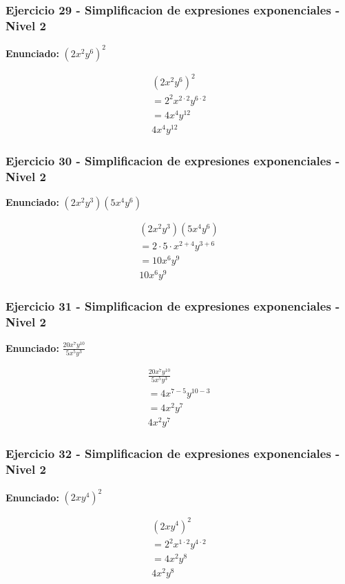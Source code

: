 \documentclass[12pt,a4paper]{article}
\begin{document}
\subsubsection*{Ejercicio 29 - Simplificacion de expresiones exponenciales - Nivel 2}
\textbf{Enunciado:} \(\left(2x^{2}y^{6}\right)^{2}\)

\[
\begin{aligned}
\left(2x^{2}y^{6}\right)^{2}\\
=2^{2}x^{2\cdot 2}y^{6\cdot 2}\\
=4x^{4}y^{12}\\
\boxed{4x^{4}y^{12}}
\end{aligned}
\]


\subsubsection*{Ejercicio 30 - Simplificacion de expresiones exponenciales - Nivel 2}
\textbf{Enunciado:} \((2x^{2}y^{3})(5x^{4}y^{6})\)

\[
\begin{aligned}
(2x^{2}y^{3})(5x^{4}y^{6})\\
=2\cdot 5\cdot x^{2+4}y^{3+6}\\
=10x^{6}y^{9}\\
\boxed{10x^{6}y^{9}}
\end{aligned}
\]


\subsubsection*{Ejercicio 31 - Simplificacion de expresiones exponenciales - Nivel 2}
\textbf{Enunciado:} \(\frac{20x^{7}y^{10}}{5x^{5}y^{3}}\)

\[
\begin{aligned}
\frac{20x^{7}y^{10}}{5x^{5}y^{3}}\\
=4x^{7-5}y^{10-3}\\
=4x^{2}y^{7}\\
\boxed{4x^{2}y^{7}}
\end{aligned}
\]


\subsubsection*{Ejercicio 32 - Simplificacion de expresiones exponenciales - Nivel 2}
\textbf{Enunciado:} \(\left(2xy^{4}\right)^{2}\)

\[
\begin{aligned}
\left(2xy^{4}\right)^{2}\\
=2^{2}x^{1\cdot 2}y^{4\cdot 2}\\
=4x^{2}y^{8}\\
\boxed{4x^{2}y^{8}}
\end{aligned}
\]
\end{document}
